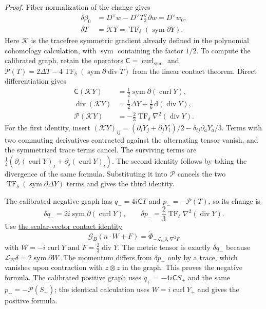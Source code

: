 \documentclass[
  english,
  11pt,
  reqno]{amsart}
\begin{document}
\emph{Proof.} Fiber normalization of the change gives%
 \[
\begin{aligned}
\delta\beta_0
&=D^\vee w-D^\vee T_2^\vee\partial w
=D^\vee w_0,\\
\delta T&=\mathcal K Y
=\operatorname{TF}_\delta(\operatorname{sym}\partial Y).
\end{aligned}
\] Here \(\mathcal K\) is the tracefree symmetric gradient already
defined in the polynomial cohomology calculation, with
\(\operatorname{sym}\) containing the factor \(1/2\). To compute the
calibrated graph, retain the operators
\(\mathsf C=\operatorname{curl}_{\mathrm{sym}}\) and
\(\mathcal P(T)=2\Delta T-4\operatorname{TF}_\delta
(\operatorname{sym}\partial\operatorname{div}T)\) from the linear
contact theorem. Direct differentiation gives%
 \[
\begin{aligned}
\mathsf C(\mathcal K Y)
&=\frac12\operatorname{sym}\partial(\operatorname{curl}Y),\\
\operatorname{div}(\mathcal K Y)
&=\frac12\Delta Y+\frac16\,\mathrm d(\operatorname{div}Y),\\
\mathcal P(\mathcal K Y)
&=-\frac23\operatorname{TF}_\delta
                   \nabla^2(\operatorname{div}Y).
\end{aligned}
\] For the first identity, insert
\((\mathcal K Y)_{ij}=(\partial_iY_j+\partial_jY_i)/2
-\delta_{ij}\partial_aY_a/3\). Terms with two commuting derivatives
contracted against the alternating tensor vanish, and the symmetrized
trace terms cancel. The surviving terms are
\(\frac14(\partial_i(\operatorname{curl}Y)_j+
\partial_j(\operatorname{curl}Y)_i)\). The second identity follows by
taking the divergence of the same formula. Substituting it into
\(\mathcal P\) cancels the two
\(\operatorname{TF}_\delta(\operatorname{sym}\partial\Delta Y)\) terms
and gives the third identity.

The calibrated negative graph has \(q_-=4i\mathsf C T\) and
\(p_-=-\mathcal P(T)\), so its change is%
 \[
\delta q_-=2i\operatorname{sym}\partial(\operatorname{curl}Y),
\qquad
\delta p_-=\frac23\operatorname{TF}_\delta
                       \nabla^2(\operatorname{div}Y).
\] Use \hyperref[eq:online-contact-scalar-vector-gauge]{the
scalar-vector contact identity} \[
\mathcal G_B(n\cdot W+F)
=\dot\Phi_{-\mathcal L_W\delta,\,\nabla^2F}
\] with \(W=-i\operatorname{curl}Y\) and
\(F=\frac23\operatorname{div}Y\). The metric tensor is exactly
\(\delta q_-\) because
\(\mathcal L_W\delta=2\operatorname{sym}\partial W\). The momentum
differs from \(\delta p_-\) only by a trace, which vanishes upon
contraction with \(z\otimes z\) in the graph. This proves the negative
formula. The calibrated positive graph uses \(q_+=-4i\mathsf C S_+\) and
the same \(p_+=-\mathcal P(S_+)\); the identical calculation uses
\(W=i\operatorname{curl}Y_+\) and gives the positive formula.
\end{document}
